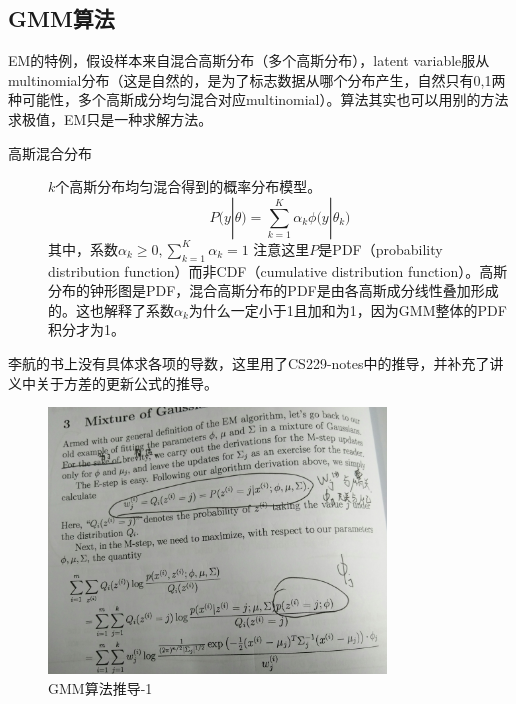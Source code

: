 \documentclass{ctexart}
\begin{document}
\subsection{GMM算法}
\label{gmm}
EM的特例，假设样本来自混合高斯分布（多个高斯分布），latent variable服从multinomial分布（这是自然的，是为了标志数据从哪个分布产生，自然只有0,1两种可能性，多个高斯成分均匀混合对应multinomial）。算法其实也可以用别的方法求极值，EM只是一种求解方法。
\begin{description}
\item[高斯混合分布]
$k$个高斯分布均匀混合得到的概率分布模型。
\begin{equation}
P\big(y|\theta \big)=\sum\limits_{k=1}^{K}\alpha_k\phi\big(y|\theta_k\big)
\end{equation}
其中，系数$\alpha_k\ge0,\sum\limits_{k=1}^{K}\alpha_k=1$
注意这里$P$是PDF（probability distribution function）而非CDF（cumulative distribution function）。高斯分布的钟形图是PDF，混合高斯分布的PDF是由各高斯成分线性叠加形成的。这也解释了系数$\alpha_k$为什么一定小于1且加和为1，因为GMM整体的PDF积分才为1。

\end{description}
李航的书上没有具体求各项的导数，这里用了CS229-notes中的推导，并补充了讲义中关于方差的更新公式的推导。
\begin{figure}[H]
\begin{center}
\includegraphics[width=0.8\textwidth]{fig/gmm1.jpg}  
\caption{GMM算法推导-1}
\end{center}
\end{figure}
\end{document}
